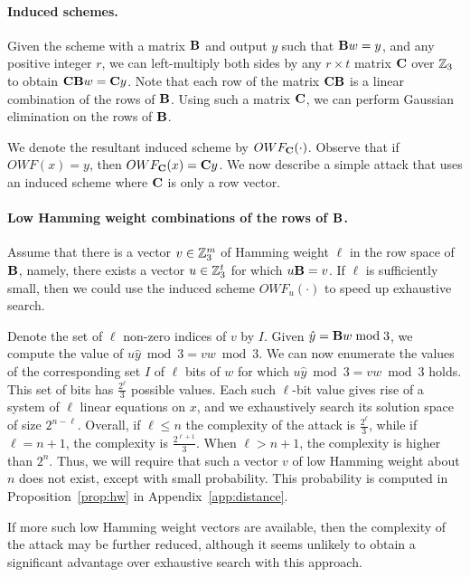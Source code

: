 \paragraph{Induced schemes.}
Given the scheme \ttOWF with a matrix $\mat{B}$ and output $y$ such that $\mat{B}w = y$, and any positive integer $r$, we can left-multiply both sides by any $r \times t$ matrix $\mat{C}$ over $\mathbb{Z}_3$ to obtain $\mat{C}\mat{B}w = \mat{C}y$. Note that each row of the matrix $\mat{CB}$ is a linear combination of the rows of $\mat{B}$. Using such a matrix $\mat{C}$, we can perform Gaussian elimination on the rows of $\mat{B}$.

We denote the resultant induced scheme by $OWF_\mat{C}(\cdot)$. Observe that if $OWF(x) = y$, then $OWF_\mat{C}(x) = \mat{C}y$.
We now describe a simple attack that uses an induced scheme where $\mat{C}$ is only a row vector.

\paragraph{Low Hamming weight combinations of the rows of $\mat{B}$.}
Assume that there is a vector $v \in \mathbb{Z}_3^m$ of Hamming weight $\ell$ in the row space of $\mat{B}$, namely, there exists a vector $u \in \mathbb{Z}_3^t$ for which $u \mat{B} = v$. If $\ell$ is sufficiently small, then we could use the induced scheme $OWF_u(\cdot)$ to speed up exhaustive search.

Denote the set of $\ell$ non-zero indices of $v$ by $I$. Given $\hat{y} = \mat{B}w \bmod 3$, we compute the value of $u\hat{y} \bmod 3 = vw \bmod 3$. We can now enumerate the values of the corresponding set $I$ of $\ell$ bits of $w$ for which $u\hat{y} \bmod 3 = vw \bmod 3$ holds. This set of bits has $\tfrac{2^\ell}{3}$ possible values. Each such $\ell$-bit value gives rise of a system of $\ell$ linear equations on $x$, and we exhaustively search its solution space of size $2^{n-\ell}$. Overall, if $\ell \leq n$ the complexity of the attack is
$\tfrac{2^{\ell}}{3}$, while if $\ell = n+1$, the complexity is $\tfrac{2^{\ell+1}}{3}$. When $\ell > n+1$, the complexity is higher than $2^n$.
Thus, we will require that such a vector $v$ of low Hamming weight about $n$ does not exist, except with small probability.
This probability is computed in Proposition~\ref{prop:hw} in Appendix~\ref{app:distance}.

If more such low Hamming weight vectors are available, then the complexity of the attack may be further reduced,
although it seems unlikely to obtain a significant advantage over exhaustive search with this approach.




